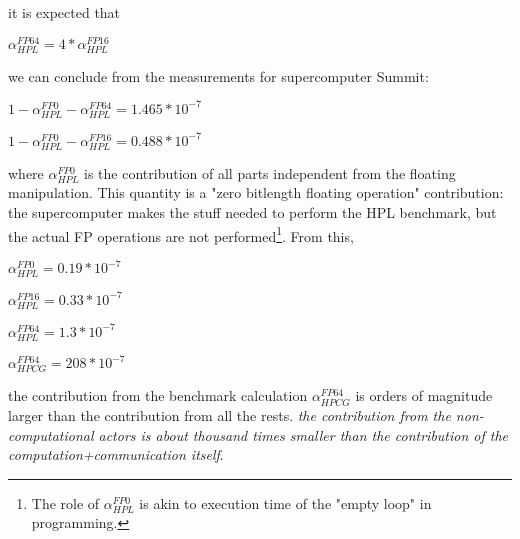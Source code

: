 {

 it is expected that

$\alpha_{HPL}^{FP64} = 4*\alpha_{HPL}^{FP16}$

we can conclude from the measurements
for supercomputer Summit:

$1-\alpha_{HPL}^{FP0}-\alpha_{HPL}^{FP64} = 1.465*10^{-7}$

$1-\alpha_{HPL}^{FP0}-\alpha_{HPL}^{FP16} = 0.488*10^{-7}$


where $\alpha_{HPL}^{FP0}$ is the contribution of all parts independent from the floating manipulation. This quantity is a "zero bitlength floating operation" contribution: the supercomputer makes the stuff needed to perform the \gls{HPL} benchmark,
but the actual FP operations are not performed\footnote{The role of $\alpha_{HPL}^{FP0}$ is akin to execution time of the "empty loop" in programming.}.  From this, 

$\alpha_{HPL}^{FP0} =0.19*10^{-7}$

$\alpha_{HPL}^{FP16} = 0.33*10^{-7}$

$\alpha_{HPL}^{FP64} = 1.3*10^{-7}$

$\alpha_{HPCG}^{FP64} = 208*10^{-7}$

the contribution from the benchmark calculation $\alpha_{HPCG}^{FP64}$
is orders of magnitude larger than the contribution from all the rests.
\textit{the contribution from the non-computational actors is
about thousand times smaller than the contribution of
the computation+communication itself}.	
}


